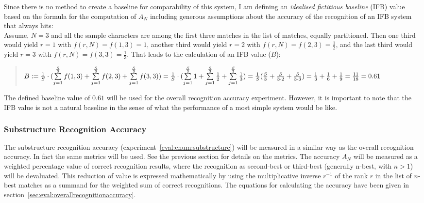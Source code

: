 Since there is no method to create a baseline for comparability of this system,
I am defining an \emph{idealised fictitious baseline} (IFB) value based on 
the formula for the computation of \(A_N\) including generous assumptions 
about the accuracy of the recognition of an IFB system that always hits: \\
Assume, \(N = 3\) and all the sample characters are among the first three 
matches in the list of matches, equally partitioned. 
Then one third would yield \(r = 1\) with \(f(r,N)=f(1,3)=1\),
another third would yield \(r = 2\) with \(f(r,N)=f(2,3)=\frac{1}{2}\),
and the last third would yield \(r = 3\) with \(f(r,N)=f(3,3)=\frac{1}{3}\).
That leads to the calculation of an IFB value (\(B\)):
\begin{quote}
  \(
    B := \frac{1}{S} \cdot (\sum\limits_{j=1}^{\frac{S}{3}}{f(1,3)} + \sum\limits_{j=1}^{\frac{S}{3}}{f(2,3)} + \sum\limits_{j=1}^{\frac{S}{3}}{f(3,3)}) \\
       = \frac{1}{S} \cdot (\sum\limits_{j=1}^{\frac{S}{3}}{1} + \sum\limits_{j=1}^{\frac{S}{3}}{\frac{1}{2}} + \sum\limits_{j=1}^{\frac{S}{3}}{\frac{1}{3}}) \\
       = \frac{1}{S} (\frac{S}{3} + \frac{S}{3 \cdot 2} + \frac{S}{3 \cdot 3}) 
       = \frac{1}{3} + \frac{1}{6} + \frac{1}{9}
       = \frac{11}{18} = 0.61
  \)
\end{quote}
The defined baseline value of \(0.61\) will be used for the overall 
recognition accuracy experiment. However, it is important to note that the 
IFB value is not a natural baseline in the sense of what the performance of a 
most simple system would be like.

\subsubsection{Substructure Recognition Accuracy}
\label{sec:eval:substructurerecognitionaccuracy}

The substructure recognition accuracy (experiment~\ref{eval:enum:substructure})
will be measured in a similar way as the overall recognition accuracy.
In fact the same metrics will be used. See the previous section for details
on the metrics. The accuracy \(A_{N}\) will be measured as a weighted percentage 
value of correct recognition results, where the recognition as second-best or 
third-best (generally n-best, with \(n>1\)) will be devaluated. %
This reduction of value is expressed mathematically by using the multiplicative 
inverse \(r^{-1}\) of the rank \(r\) in the list of \(n\)-best 
matches as a summand for the weighted sum of correct recognitions.
The equations for calculating the accuracy have been given in 
section~\ref{sec:eval:overallrecognitionaccuracy}.

